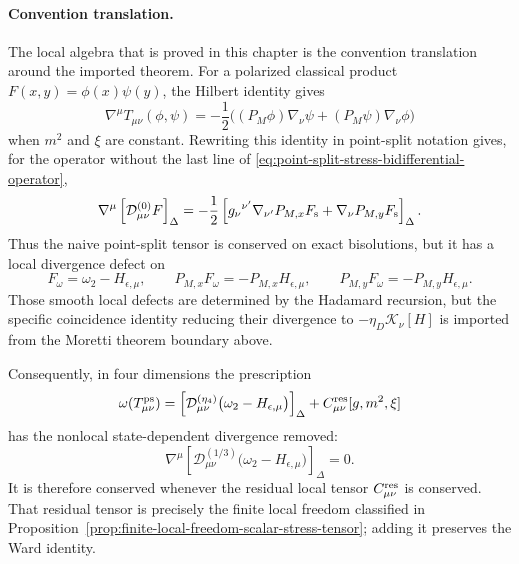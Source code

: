 \paragraph{Convention translation.}
The local algebra that is proved in this chapter is the convention
translation around the imported theorem.  For a polarized classical product
\(F(x,y)=\phi(x)\psi(y)\), the Hilbert identity gives
\[
  \nabla^\mu T_{\mu\nu}(\phi,\psi)
  =
  -\frac12\bigl((P_M\phi)\nabla_\nu\psi+(P_M\psi)\nabla_\nu\phi\bigr)
\]
when \(m^2\) and \(\xi\) are constant.  Rewriting this identity in
point-split notation gives, for the operator without the last line of
\eqref{eq:point-split-stress-bidifferential-operator},
\begin{equation}
  \nabla^\mu
  \left[\mathcal D_{\mu\nu}^{(0)}F\right]_\Delta
  =
  -\frac12
  \left[
    g_\nu{}^{\nu'}\nabla_{\nu'}P_{M,x}F_{\rm s}
    +\nabla_\nu P_{M,y}F_{\rm s}
  \right]_\Delta .
  \label{eq:naive-point-split-divergence-defect}
\end{equation}
Thus the naive point-split tensor is conserved on exact bisolutions, but it
has a local divergence defect on
\[
  F_\omega=\omega_2-H_{\epsilon,\mu},
  \qquad
  P_{M,x}F_\omega=-P_{M,x}H_{\epsilon,\mu},\qquad
  P_{M,y}F_\omega=-P_{M,y}H_{\epsilon,\mu}.
\]
Those smooth local defects are determined by the Hadamard recursion, but the
specific coincidence identity reducing their divergence to
\(-\eta_D\mathcal K_\nu[H]\) is imported from the Moretti theorem boundary
above.

Consequently, in four dimensions the prescription
\begin{equation}
  \omega(T_{\mu\nu}^{\rm ps})
  =
  \left[
    \mathcal D_{\mu\nu}^{(\eta_4)}
    \bigl(\omega_2-H_{\epsilon,\mu}\bigr)
  \right]_\Delta
  +C_{\mu\nu}^{\rm res}[g,m^2,\xi]
  \label{eq:conserved-point-split-stress-prescription}
\end{equation}
has the nonlocal state-dependent divergence removed:
\[
  \nabla^\mu
  \left[
    \mathcal D_{\mu\nu}^{(1/3)}
    \bigl(\omega_2-H_{\epsilon,\mu}\bigr)
  \right]_\Delta
  =
  0 .
\]
It is therefore conserved whenever the residual local tensor
\(C_{\mu\nu}^{\rm res}\) is conserved.  That residual tensor is precisely the
finite local freedom classified in
Proposition~\ref{prop:finite-local-freedom-scalar-stress-tensor}; adding it
preserves the Ward identity.

